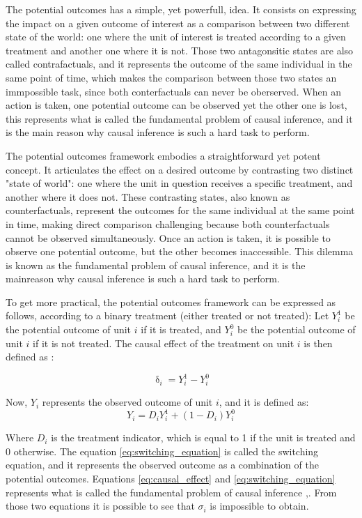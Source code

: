 The potential outcomes has a simple, yet powerfull, idea. It consists on expressing the impact on a given outcome of interest as a comparison between two different state of the world: one
where the unit of interest is treated according to a given treatment and another one where it is not. Those two antagonsitic states are also called contrafactuals, and it represents
the outcome of the same individual in the same point of time, which makes the comparison between those two states an immpossible task, since both conterfactuals can never be oberserved.
When an action is taken, one potential outcome can be observed yet the other one is lost, this represents what is called the fundamental problem of causal inference, and it is the main
reason why causal inference is such a hard task to perform.

The potential outcomes framework embodies a straightforward yet potent concept. It articulates the effect on a desired outcome by contrasting two distinct "state of world": one where the unit 
in question receives a specific treatment, and another where it does not. These contrasting states, also known as counterfactuals, represent the outcomes for the same individual at the same point 
in time, making direct comparison challenging because both counterfactuals cannot be observed simultaneously. Once an action is taken, it is possible to observe one potential outcome, but the other becomes
inaccessible. This dilemma is known as the fundamental problem of causal inference, and it is the mainreason why causal inference is such a hard task to perform.

To get more practical, the potential outcomes framework can be expressed as follows, according to a binary treatment (either treated or not treated): Let $Y_i^1$ be the potential
outcome of unit $i$ if it is treated, and $Y_i^0$ be the potential outcome of unit $i$ if it is not treated. The causal effect of the treatment on unit $i$
is then defined as :

\begin{equation}
\updelta_i = Y_i^1 - Y_i^0
\label{eq:causal_effect}
\end{equation}

Now, $Y_i$ represents the observed outcome of unit $i$, and it is defined as:
\begin{equation}
 Y_i = D_iY_i^1 + (1 - D_i)Y_i^0
\label{eq:switching_equation}
\end{equation}

Where $D_i$ is the treatment indicator, which is equal to 1 if the unit is treated and 0 otherwise. The equation \ref{eq:switching_equation} is called the switching equation, and it represents
the observed outcome as a combination of the potential outcomes. Equations \ref{eq:causal_effect} and \ref{eq:switching_equation} represents what is called 
the fundamental problem of causal inference ,\parencite{holland_statistics_1986}. From those two equations it is possible to see that $\sigma_i$ is impossible to obtain.  

